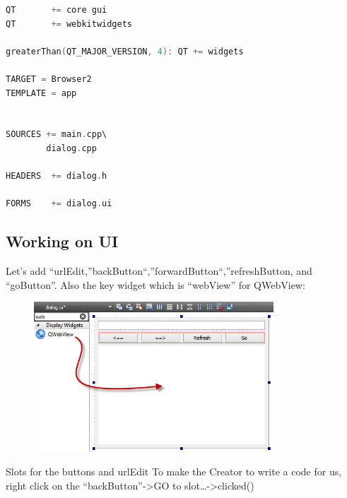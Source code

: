 \begin{lstlisting}[language=c++, numbers=none]
QT       += core gui
QT       += webkitwidgets

greaterThan(QT_MAJOR_VERSION, 4): QT += widgets

TARGET = Browser2
TEMPLATE = app


SOURCES += main.cpp\
        dialog.cpp

HEADERS  += dialog.h

FORMS    += dialog.ui
\end{lstlisting}

\subsection{Working on UI}\label{working-on-ui}

Let's add ``urlEdit,''backButton``,''forwardButton``,''refreshButton,
and ``goButton''. Also the key widget which is ``webView'' for QWebView:

\begin{figure}[htbp]
\centering
\includegraphics[width=0.8\textwidth]{../manuscript/images/AddingWebView}
\caption{}
\end{figure}

Slots for the buttons and urlEdit To make the Creator to write a code
for us, right click on the ``backButton''-\textgreater{}GO to
slot\ldots{}-\textgreater{}clicked()

